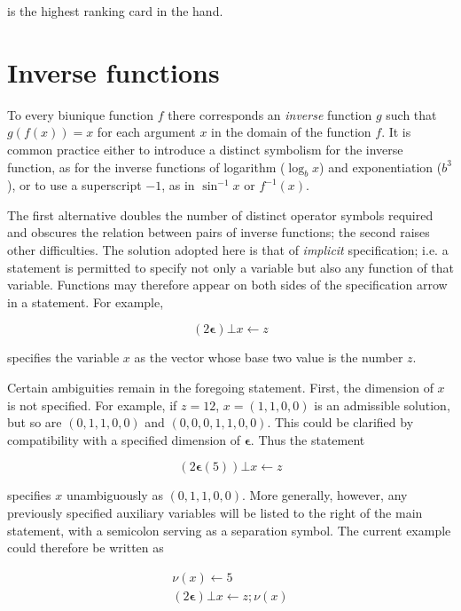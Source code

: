 \par is the highest ranking card in the hand.

\section{Inverse functions}

\par To every biunique%
function $f$ there corresponds an \textit{inverse} function $g$ such that $g(f(x)) = x$ for each argument $x$ in the domain of the function $f$. It is common practice either to introduce a distinct symbolism for the inverse function, as for the inverse functions of logarithm ($\log_b x$) and exponentiation ($b^3$), or to use a superscript $-1$, as in $\sin^{-1}x$ or $f^{-1}(x)$.

\par The first alternative doubles the number of distinct operator symbols required and obscures the relation between pairs of inverse functions; the second raises other difficulties. The solution adopted here is that of \textit{implicit} specification; i.e. a statement is permitted to specify not only a variable but also any function of that variable. Functions may therefore appear on both sides of the specification arrow in a statement. For example,

$$
  (2\textbf{ϵ}) ⊥ x ← z
$$

\noindent specifies the variable $x$ as the vector whose base two value is the number $z$.

\par Certain ambiguities remain in the foregoing statement. First, the dimension of $x$ is not specified. For example, if $z = 12$, $x = (1, 1, 0, 0)$ is an admissible solution, but so are $(0, 1, 1, 0, 0)$ and $(0, 0, 0, 1, 1, 0, 0)$. This could be clarified by compatibility with a specified dimension of $\textbf{ϵ}$. Thus the statement

$$
  (2\textbf{ϵ}(5)) ⊥ x ← z
$$

\noindent specifies $x$ unambiguously as $(0, 1, 1, 0, 0)$. More generally, however, any previously specified auxiliary variables will be listed to the right of the main statement, with a semicolon serving as a separation symbol. The current example could therefore be written as

\begin{align*}
  ν(x) ← 5 \\
  (2\textbf{ϵ}) ⊥ x ← z; ν(x)
\end{align*}

